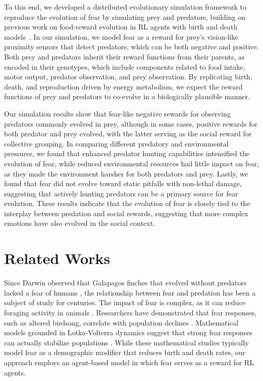 \documentclass[dvipsnames,format=sigconf]{acmart}
\newcommand{\1}{\mathbb{I} } %
\begin{document}
To this end, we developed a distributed evolutionary simulation framework to reproduce the evolution of fear by simulating prey and predators, building on previous work on food-reward evolution in RL agents with birth and death models~\citep{kanagawaEvolutionRewardsFood2024}. In our simulation, we model fear as a reward for prey's vision-like proximity sensors that detect predators, which can be both negative and positive. Both prey and predators inherit their reward functions from their parents, as encoded in their genotypes, which include components related to food intake, motor output, predator observation, and prey observation.
By replicating birth, death, and reproduction driven by energy metabolism, we expect the reward functions of prey and predators to co-evolve in a biologically plausible manner.

Our simulation results show that fear-like negative rewards for observing predators commonly evolved in prey, although in some cases, positive rewards for both predator and prey evolved, with the latter serving as the social reward for collective grouping.
In comparing different predatory and environmental pressures, we found that enhanced predator hunting capabilities intensified the evolution of fear, while reduced environmental resources had little impact on fear, as they made the environment harsher for both predators and prey. Lastly, we found that fear did not evolve toward static pitfalls with non-lethal damage, suggesting that actively hunting predators can be a primary source for fear evolution. These results indicate that the evolution of fear is closely tied to the interplay between predation and social rewards, suggesting that more complex emotions have also evolved in the social context.

\section{Related Works}\label{sec:related}
Since Darwin observed that Galapagos finches that evolved without predators lacked a fear of humans \citep{darwinVoyageBeagle2022}, the relationship between fear and predation has been a subject of study for centuries. The impact of fear is complex, as it can reduce foraging activity in animals \citep{zanetteEcologyFear2019}. Researchers have demonstrated that fear responses, such as altered birdsong, correlate with population declines \citep{zanetteEcologyNeurobiologyFear2020, allenFearPredatorsFreeliving2022}. Mathematical models grounded in Lotka-Volterra dynamics \citep{wangerskyLotkaVolterraPopulationModels1978} suggest that strong fear responses can actually stabilize populations \citep{sarkarImpactFearEffect2020}. While these mathematical studies typically model fear as a demographic modifier that reduces birth and death rates, our approach employs an agent-based model in which fear serves as a reward for RL agents.
\end{document}
